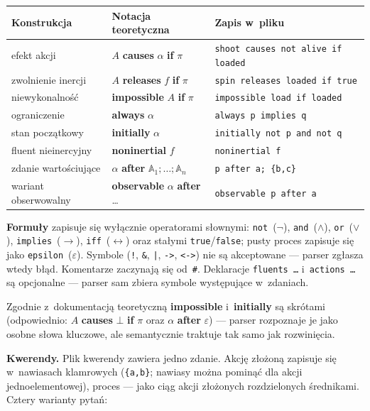 \documentclass[11pt,a4paper]{article}
\begin{document}
\begin{center}
\small
\begin{tabular}{@{}lll@{}}
\toprule
\textbf{Konstrukcja} & \textbf{Notacja teoretyczna} & \textbf{Zapis w~pliku} \\
\midrule
efekt akcji        & $A$ \textbf{causes} $\alpha$ \textbf{if} $\pi$ & \texttt{shoot causes not alive if loaded} \\
zwolnienie inercji & $A$ \textbf{releases} $f$ \textbf{if} $\pi$    & \texttt{spin releases loaded if true} \\
niewykonalność     & \textbf{impossible} $A$ \textbf{if} $\pi$      & \texttt{impossible load if loaded} \\
ograniczenie       & \textbf{always} $\alpha$                       & \texttt{always p implies q} \\
stan początkowy    & \textbf{initially} $\alpha$                    & \texttt{initially not p and not q} \\
fluent nieinercyjny& \textbf{noninertial} $f$                       & \texttt{noninertial f} \\
zdanie wartościujące & $\alpha$ \textbf{after} $\mathbb{A}_1;\dots;\mathbb{A}_n$ & \texttt{p after a; \{b,c\}} \\
wariant obserwowalny & \textbf{observable} $\alpha$ \textbf{after} \dots & \texttt{observable p after a} \\
\bottomrule
\end{tabular}
\end{center}

\textbf{Formuły} zapisuje się wyłącznie operatorami słownymi:
\texttt{not}~($\lnot$), \texttt{and}~($\land$), \texttt{or}~($\lor$),
\texttt{implies}~($\rightarrow$), \texttt{iff}~($\leftrightarrow$) oraz stałymi
\texttt{true}/\texttt{false}; pusty proces zapisuje się jako
\texttt{epsilon}~($\varepsilon$). Symbole (\texttt{!}, \texttt{\&}, \texttt{|},
\texttt{->}, \texttt{<->}) nie są akceptowane --- parser zgłasza wtedy błąd.
Komentarze zaczynają się od~\texttt{\#}.
Deklaracje \texttt{fluents \dots} i~\texttt{actions \dots} są opcjonalne ---
parser sam zbiera symbole występujące w~zdaniach.

Zgodnie z~dokumentacją teoretyczną \textbf{impossible} i~\textbf{initially}
są skrótami (odpowiednio: $A$ \textbf{causes} $\bot$ \textbf{if} $\pi$ oraz
$\alpha$ \textbf{after} $\varepsilon$) --- parser rozpoznaje je jako osobne
słowa kluczowe, ale semantycznie traktuje tak samo jak rozwinięcia.

\textbf{Kwerendy.} Plik kwerendy zawiera jedno zdanie. Akcję złożoną zapisuje
się w~nawiasach klamrowych (\texttt{\{a,b\}}; nawiasy można pominąć dla akcji
jednoelementowej), proces --- jako ciąg akcji złożonych rozdzielonych
średnikami. Cztery warianty pytań:
\end{document}
